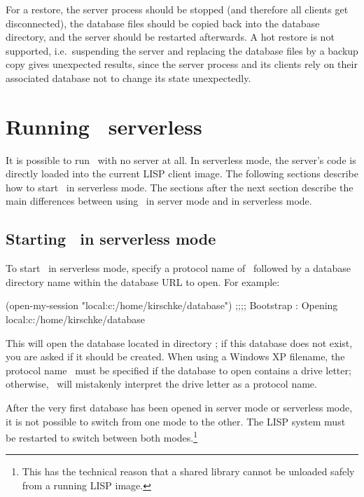 For a restore, the server process should be stopped (and therefore all
clients get disconnected), the database files should be copied back
into the database directory, and the server should be restarted
afterwards. A hot restore is not supported, i.e.\ suspending the
server and replacing the database files by a backup copy gives
unexpected results, since the server process and its clients rely on
their associated database not to change its state unexpectedly.

\section[Serverless PLOB]{Running \protect\plob\ serverless}

It is possible to run \plob\ with no server at all. In serverless
mode, the server's code is directly loaded into the current LISP
client image. The following sections describe how to start \plob\ in
serverless mode. The sections after the next section describe the main
differences between using \plob\ in server mode and in serverless
mode.

\subsection[Starting PLOB in serverless mode]
{Starting \protect\plob\ in serverless mode}

To start \plob\ in serverless mode, specify a protocol name of
\ followed by a database directory name within the database
URL to open. For example:
\begin{CompactCode}
\listener{}(open-my-session "local:c:/home/kirschke/database")
;;;; Bootstrap   : Opening local:c:/home/kirschke/database
\OmitUnimportant
\end{CompactCode}
This will open the database located in directory
; if this database does not exist, you
are asked if it should be created. When using a Windows XP
filename, the protocol name \ must be specified if
the database to open contains a drive letter; otherwise, \plob\ will
mistakenly interpret the drive letter as a protocol name.

After the very first database has been opened in server mode or
serverless mode, it is not possible to switch from one mode to the
other. The LISP system must be restarted to switch between both
modes.\footnote{This has the technical reason that a shared library
  cannot be unloaded safely from a running LISP image.}

